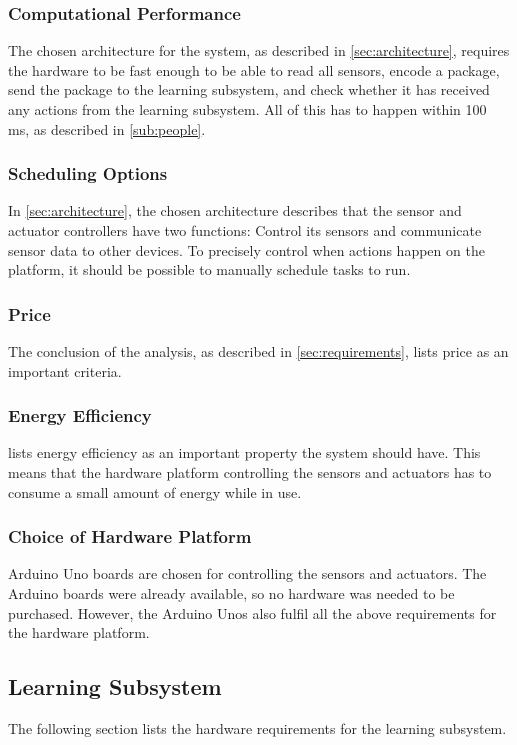 \subsubsection{Computational Performance}
The chosen architecture for the system, as described in \cref{sec:architecture}, requires the hardware to be fast enough to be able to read all sensors, encode a package, send the package to the learning subsystem, and check whether it has received any actions from the learning subsystem. All of this has to happen within 100 ms, as described in \cref{sub:people}.

\subsubsection{Scheduling Options}
In \cref{sec:architecture}, the chosen architecture describes that the sensor and actuator controllers have two functions: Control its sensors and communicate sensor data to other devices. To precisely control when actions happen on the platform, it should be possible to manually schedule tasks to run.

\subsubsection{Price}
The conclusion of the analysis, as described in \cref{sec:requirements}, lists price as an important criteria.

\subsubsection{Energy Efficiency}
 lists energy efficiency as an important property the system should have. This means that the hardware platform controlling the sensors and actuators has to consume a small amount of energy while in use.

\subsubsection{Choice of Hardware Platform}
Arduino Uno boards are chosen for controlling the sensors and actuators. The Arduino boards were already available, so no hardware was needed to be purchased. However, the Arduino Unos also fulfil all the above requirements for the hardware platform.

\subsection{Learning Subsystem}
The following section lists the hardware requirements for the learning subsystem.

